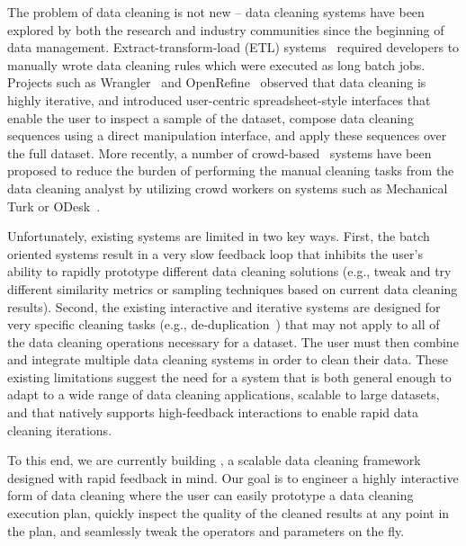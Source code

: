 The problem of data cleaning is not new -- data cleaning systems have been
explored by both the research and industry communities since the beginning of data management.
Extract-transform-load (ETL) systems~\cite{informatica,talend,nadeef}
required developers to manually wrote data cleaning rules which were executed as 
long batch jobs.  
Projects such as Wrangler~\cite{wrangler,trifacta} and
OpenRefine~\cite{openrefine} observed that data cleaning is highly iterative, and
introduced user-centric spreadsheet-style interfaces that enable the user to inspect a sample of the dataset, 
compose data cleaning sequences using a direct manipulation interface, and apply these sequences over the full dataset.   
More recently, a number of crowd-based~\cite{gokhale2014corleone,stonebraker2013data}
systems have been proposed to reduce the burden of performing the manual cleaning tasks from the data cleaning analyst 
by utilizing crowd workers on systems such as Mechanical Turk or ODesk~\cite{argonaut}.

Unfortunately, existing systems are limited in two key ways.
First, the batch oriented systems result in a very slow feedback loop 
that inhibits the user's ability to rapidly prototype different data cleaning solutions (e.g., tweak and 
try different similarity metrics or sampling techniques based on current data cleaning results).
Second, the existing interactive and iterative systems are designed for very specific cleaning tasks 
(e.g., de-duplication~\cite{gokhale2014corleone,park2014crowdfill,eracer,chen2014integrating}) that may not apply to all of the data 
cleaning operations necessary for a dataset.  The user must then combine and integrate multiple
data cleaning systems in order to clean their data.
These existing limitations suggest the need for a system that is both general enough to
adapt to a wide range of data cleaning applications, scalable to large datasets, 
and that natively supports high-feedback interactions to enable rapid data cleaning iterations.

To this end, we are currently building \sys, a scalable data cleaning
framework designed with rapid feedback in mind.  Our goal is to
engineer a highly interactive form of data cleaning where the user can easily prototype a data cleaning execution plan,
quickly inspect the quality of the cleaned results at any point in the plan, and seamlessly
tweak the operators and parameters on the fly.

